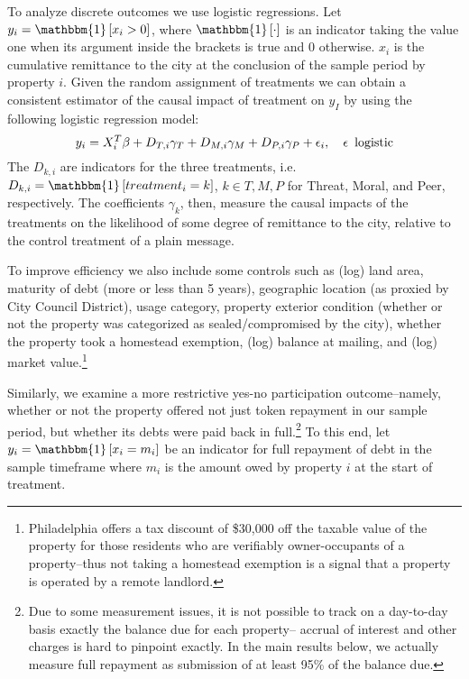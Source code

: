 \documentclass[12pt,titlepage]{article}
\begin{document}
To analyze discrete outcomes we use logistic regressions.
Let $y_{i}=\mathbbm{1}\left[x_i>0\right]$, where
$\mathbbm{1}\left[\cdot\right]$ is an indicator taking the value one
when its argument inside the brackets is true and 0 otherwise. $x_i$ is the
cumulative remittance to the city at the conclusion of the sample
period by property $i$. Given the random assignment of treatments
we can obtain a consistent estimator of the causal impact of treatment on
$y_I$ by using the following logistic regression model:
\begin{equation}
y_{i}=X_i^T\beta +D_{T,i}\gamma_{T}+D_{M,i}\gamma_{M}+D_{P,i}\gamma_{P}
+\epsilon_{i},\hspace{1em}\epsilon \enskip\mbox{logistic}
\end{equation}
The $D_{k,i}$ are indicators for the three treatments, i.e.
$D_{k,i}=\mathbbm{1}\left[treatment_i=k\right]$, $k\in{T,M,P}$ for
Threat, Moral, and Peer, respectively. The coefficients $\gamma_{k}$, then, measure
the causal impacts of the treatments on the likelihood of some degree
of remittance to the city, relative to the control treatment of a
plain message. 

To improve efficiency we also include some controls such as (log) land area, maturity of debt (more
or less than 5 years), geographic location (as proxied by City Council
District), usage category, property exterior condition (whether or not
the property was categorized as sealed/compromised by the city),
whether the property took a homestead exemption, (log) balance at
mailing, and (log) market value.\footnote{Philadelphia
  offers a tax discount of \$30,000 off the taxable value of the
  property for those residents who are verifiably owner-occupants of a
  property--thus not taking a homestead exemption is a signal that a
  property is operated by a remote landlord.}

Similarly, we examine a more restrictive yes-no participation
outcome--namely, whether or not the property offered not just token
repayment in our sample period, but whether its debts were paid back
in full.\footnote{Due to some measurement issues, it is not possible to
  track on a day-to-day basis exactly the balance due for each
  property-- accrual of interest and other charges is hard to pinpoint
  exactly. In the main results below, we actually measure full
  repayment as submission of at least 95\% of the balance due.} To this end, let $y_{i}=\mathbbm{1}\left[x_i=m_i\right]$ be an
indicator for full repayment of debt in the sample timeframe where $m_i$ is
the amount owed by property $i$ at the start of treatment. 
\end{document}

